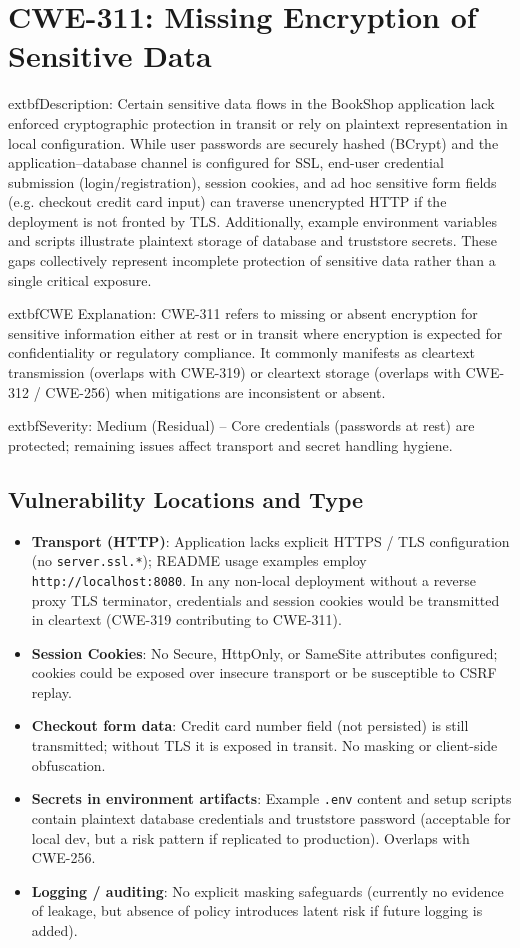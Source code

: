 \documentclass[]{UCD_CS_FYP_Report}
\begin{document}
\section{CWE-311: Missing Encryption of Sensitive Data}

	extbf{Description}: Certain sensitive data flows in the BookShop application lack enforced cryptographic protection in transit or rely on plaintext representation in local configuration. While user passwords are securely hashed (BCrypt) and the application--database channel is configured for SSL, end-user credential submission (login/registration), session cookies, and ad hoc sensitive form fields (e.g. checkout credit card input) can traverse unencrypted HTTP if the deployment is not fronted by TLS. Additionally, example environment variables and scripts illustrate plaintext storage of database and truststore secrets. These gaps collectively represent incomplete protection of sensitive data rather than a single critical exposure.

	extbf{CWE Explanation}: CWE-311 refers to missing or absent encryption for sensitive information either at rest or in transit where encryption is expected for confidentiality or regulatory compliance. It commonly manifests as cleartext transmission (overlaps with CWE-319) or cleartext storage (overlaps with CWE-312 / CWE-256) when mitigations are inconsistent or absent.

	extbf{Severity}: Medium (Residual) -- Core credentials (passwords at rest) are protected; remaining issues affect transport and secret handling hygiene.

\subsection*{Vulnerability Locations and Type}
\begin{itemize}
	\item \textbf{Transport (HTTP)}: Application lacks explicit HTTPS / TLS configuration (no \texttt{server.ssl.*}); README usage examples employ \texttt{http://localhost:8080}. In any non-local deployment without a reverse proxy TLS terminator, credentials and session cookies would be transmitted in cleartext (CWE-319 contributing to CWE-311).
	\item \textbf{Session Cookies}: No Secure, HttpOnly, or SameSite attributes configured; cookies could be exposed over insecure transport or be susceptible to CSRF replay.
	\item \textbf{Checkout form data}: Credit card number field (not persisted) is still transmitted; without TLS it is exposed in transit. No masking or client-side obfuscation.
	\item \textbf{Secrets in environment artifacts}: Example \texttt{.env} content and setup scripts contain plaintext database credentials and truststore password (acceptable for local dev, but a risk pattern if replicated to production). Overlaps with CWE-256.
	\item \textbf{Logging / auditing}: No explicit masking safeguards (currently no evidence of leakage, but absence of policy introduces latent risk if future logging is added).
\end{itemize}
\end{document}
